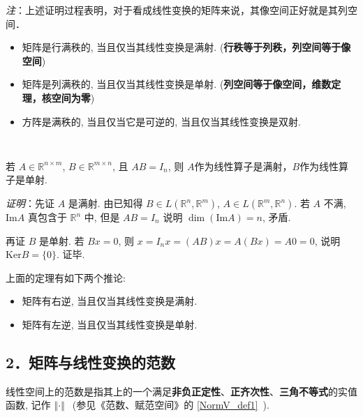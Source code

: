 \textsl{注}：上述证明过程表明，对于看成线性变换的矩阵来说，其像空间正好就是其列空间． 

\begin{itemize}
\item 矩阵是行满秩的, 当且仅当其线性变换是满射. (\textbf{行秩等于列秩，列空间等于像空间})
\end{itemize}

\begin{itemize}
\item 矩阵是列满秩的, 当且仅当其线性变换是单射. (\textbf{列空间等于像空间，维数定理，核空间为零})
\end{itemize}

\begin{itemize}
\item 方阵是满秩的, 当且仅当它是可逆的, 当且仅当其线性变换是双射. \end{itemize}
\verb| |

\begin{theorem}{}
若 $A\in\mathbb{R}^{n\times m}$, $B\in\mathbb{R}^{m\times n}$, 且 $AB=I_n$, 则 $A$作为线性算子是满射，$B$作为线性算子是单射.

\textsl{证明}：先证 $A$ 是满射. 由已知得 $B\in L(\mathbb{R}^{n},\mathbb{R}^{m})$, $A\in L(\mathbb{R}^{m},\mathbb{R}^{n})$.
若 $A$ 不满, $\mathrm{Im}A$ 真包含于 $\mathbb{R}^{n}$ 中, 但是 $AB=I_{n}$
说明 $\dim(\mathrm{Im}A)=n$, 矛盾. 

再证 $B$ 是单射. 若 $Bx=0$, 则 $x=I_{n}x=(AB)x=A(Bx)=A0=0$, 说明 $\mathrm{Ker}B=\{0\}$.
证毕. 
\end{theorem}

上面的定理有如下两个推论:

\begin{itemize}
\item 矩阵有右逆, 当且仅当其线性变换是满射. \end{itemize}

\begin{itemize}
\item 矩阵有左逆, 当且仅当其线性变换是单射. 
\end{itemize}




\subsection{2．矩阵与线性变换的范数}
线性空间上的范数是指其上的一个满足\textbf{非负正定性}、\textbf{正齐次性}、\textbf{三角不等式}的实值函数, 记作 $\left\Vert \cdot\right\Vert ~~$ 
(参见《范数、赋范空间》的 \autoref{NormV_def1}~). 

